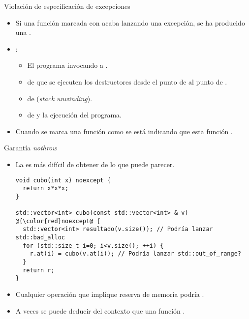 \begin{frame}[t,fragile]{Violación de especificación de excepciones}
\begin{itemize}
  \item Si una función marcada con  acaba lanzando una
        excepción, se ha producido una .

  \item {}:
    \begin{itemize}
      \item El programa  invocando a .
      \item {} de que se ejecuten los destructores desde el punto
            de  al punto de .
      \item {} de 
             (\emph{stack unwinding}).
      \item {} de  y 
             la ejecución del programa.
    \end{itemize}

  \item Cuando se marca una función como  se está indicando
        que esta función .
\end{itemize}
\end{frame}

\begin{frame}[t,fragile]{Garantía \emph{nothrow}}
\begin{itemize}
  \item La  es más difícil de obtener
        de lo que puede parecer.

\begin{lstlisting}[escapechar=@]
void cubo(int x) noexcept {
  return x*x*x;
}

std::vector<int> cubo(const std::vector<int> & v) @{\color{red}noexcept@ {
  std::vector<int> resultado(v.size()); // Podría lanzar std::bad_alloc
  for (std::size_t i=0; i<v.size(); ++i) {
    r.at(i) = cubo(v.at(i)); // Podría lanzar std::out_of_range?
  }
  return r;
}
\end{lstlisting}

  \item Cualquier operación que implique reserva de memoria podría 
         
        .

  \item A veces se puede deducir del contexto que una función 
        .

\end{itemize}
\end{frame}

